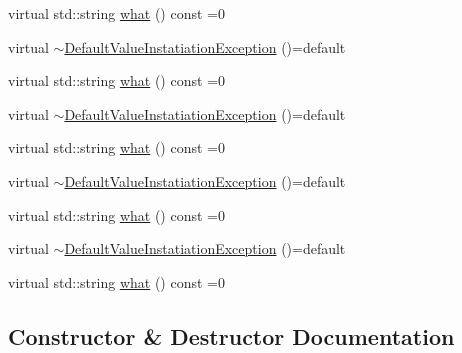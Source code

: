 \begin{DoxyCompactItemize}
\item 
virtual std\+::string \mbox{\hyperlink{structfakeit_1_1DefaultValueInstatiationException_a64d51af8601b672a5300c38a91b0b44d}{what}} () const =0
\item 
virtual \mbox{\hyperlink{structfakeit_1_1DefaultValueInstatiationException_ac3ca7aace218927f9e3bed6dfa54d672}{$\sim$\+Default\+Value\+Instatiation\+Exception}} ()=default
\item 
virtual std\+::string \mbox{\hyperlink{structfakeit_1_1DefaultValueInstatiationException_a64d51af8601b672a5300c38a91b0b44d}{what}} () const =0
\item 
virtual \mbox{\hyperlink{structfakeit_1_1DefaultValueInstatiationException_ac3ca7aace218927f9e3bed6dfa54d672}{$\sim$\+Default\+Value\+Instatiation\+Exception}} ()=default
\item 
virtual std\+::string \mbox{\hyperlink{structfakeit_1_1DefaultValueInstatiationException_a64d51af8601b672a5300c38a91b0b44d}{what}} () const =0
\item 
virtual \mbox{\hyperlink{structfakeit_1_1DefaultValueInstatiationException_ac3ca7aace218927f9e3bed6dfa54d672}{$\sim$\+Default\+Value\+Instatiation\+Exception}} ()=default
\item 
virtual std\+::string \mbox{\hyperlink{structfakeit_1_1DefaultValueInstatiationException_a64d51af8601b672a5300c38a91b0b44d}{what}} () const =0
\item 
virtual \mbox{\hyperlink{structfakeit_1_1DefaultValueInstatiationException_ac3ca7aace218927f9e3bed6dfa54d672}{$\sim$\+Default\+Value\+Instatiation\+Exception}} ()=default
\item 
virtual std\+::string \mbox{\hyperlink{structfakeit_1_1DefaultValueInstatiationException_a64d51af8601b672a5300c38a91b0b44d}{what}} () const =0
\end{DoxyCompactItemize}


\subsection{Constructor \& Destructor Documentation}
\mbox{\label{structfakeit_1_1DefaultValueInstatiationException_ac3ca7aace218927f9e3bed6dfa54d672}} 
